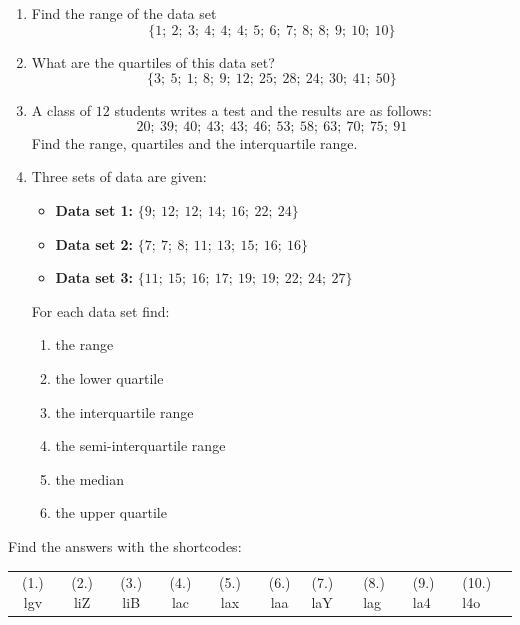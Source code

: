 \begin{exercises}{}{
  \begin{enumerate}[noitemsep, label=\textbf{\arabic*}.]

  \item Find the range of the data set
    \begin{equation*}
      \{1;\ 2;\ 3;\ 4;\ 4;\ 4;\ 5;\ 6;\ 7;\ 8;\ 8;\ 9;\ 10;\ 10\}
    \end{equation*}

  \item What are the quartiles of this data set?
    \begin{equation*}
      \{3;\ 5;\ 1;\ 8;\ 9;\ 12;\ 25;\ 28;\ 24;\ 30;\ 41;\ 50\}
    \end{equation*}

  \item A class of $12$ students writes a test and the results are as
    follows:
    \begin{equation*}
      20;\ 39;\ 40;\ 43;\ 43;\ 46;\ 53;\ 58;\ 63;\ 70;\ 75;\ 91
    \end{equation*}
    Find the range, quartiles and the interquartile range.

  \item Three sets of data are given:
    \begin{itemize}  
    \item \textbf{Data set 1:} $\{9;\ 12;\ 12;\ 14;\ 16;\ 22;\ 24\}$
    \item \textbf{Data set 2:} $\{7;\ 7;\ 8;\ 11;\ 13;\ 15;\ 16;\ 16\}$
    \item \textbf{Data set 3:} $\{11;\ 15;\ 16;\ 17;\ 19;\ 19;\ 22;\ 24;\ 27\}$
    \end{itemize}
    For each data set find:
    \begin{enumerate}  \begin{enumerate}[noitemsep, label=\textbf{(\alph*)} ]
    \item the range
    \item the lower quartile
    \item the interquartile range
    \item the semi-interquartile range
    \item the median
    \item the upper quartile
    \end{enumerate}
  \end{enumerate}
  \end{enumerate}
\practiceinfo
\par {}Find the answers with the shortcodes:
\par \begin{tabular}[h]{cccccc}
(1.) lgv  &  (2.) liZ  &  (3.) liB  &  (4.) lac  &  (5.) lax  &  (6.) laa  &  (7.) laY  &  (8.) lag  &  (9.) la4  &  (10.) l4o  & \end{tabular}
}
\end{exercises}

